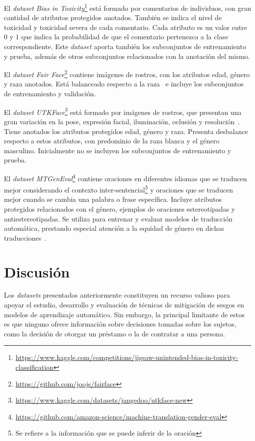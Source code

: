     El \emph{dataset} \emph{Bias in Toxicity}\footnote{\url{https://www.kaggle.com/competitions/jigsaw-unintended-bias-in-toxicity-classification}}
    est\'a formado por comentarios de individuos, con gran cantidad de atributos protegidos anotados. Tambi\'en se 
    indica el nivel de toxicidad y toxicidad severa de cada comentario. Cada atributo es un valor entre $0$ y $1$ que indica la probabilidad de 
    que el comentario pertenezca a la clase correspondiente. Este \emph{dataset} aporta tambi\'en los subconjuntos de entrenamiento y prueba, adem\'as 
    de otros subconjuntos relacionados con la anotaci\'on del mismo.  

    El \emph{dataset} \emph{Fair Face}\footnote{\url{https://github.com/joojs/fairface}} contiene im\'agenes de rostros, con los atributos edad, 
    g\'enero y raza anotados. Est\'a balanceado respecto a la raza~\parencite{karkkainenfairface} e incluye los subconjuntos de entrenamiento y 
    validaci\'on.

    El \emph{dataset} \emph{UTKFace}\footnote{\url{https://www.kaggle.com/datasets/jangedoo/utkface-new}} est\'a formado por im\'agenes de rostros, que 
    presentan una gran variaci\'on en la pose, expresi\'on facial, iluminaci\'on, oclusi\'on y resoluci\'on~\parencite{zhang2017age}. 
    Tiene anotados los atributos protegidos edad, g\'enero y raza. Presenta desbalance respecto a estos atributos, con predominio de la raza 
    blanca y el g\'enero masculino. Inicialmente no se incluyen los subconjuntos de entrenamiento y prueba.

    El \emph{dataset} \emph{MTGenEval}\footnote{\url{https://github.com/amazon-science/machine-translation-gender-eval}} contiene oraciones en 
    diferentes idiomas que se traducen mejor considerando el contexto inter-sentencial\footnote{Se refiere a la informaci\'on que se puede 
    inferir de la oraci\'on} y oraciones que se traducen mejor cuando se cambia una palabra o frase espec\'ifica. Incluye atributos protegidos 
    relacionados con el g\'enero, ejemplos de oraciones estereotipadas y antiestereotipadas. Se utiliza para entrenar y evaluar modelos de 
    traducci\'on autom\'atica, prestando especial atenci\'on a la equidad de g\'enero en dichas traducciones~\parencite{Currey2022}.

\section{Discusi\'on}

Los \emph{datasets} presentados anteriormente constituyen un recurso valioso para apoyar el estudio, desarrollo y evaluaci\'on de t\'ecnicas de 
mitigaci\'on de sesgos en modelos de aprendizaje autom\'atico. Sin embargo, la principal limitante de estos es que ninguno ofrece 
informaci\'on sobre decisiones tomadas sobre los sujetos, como la decisi\'on de otorgar un pr\'estamo o la de contratar a una persona.

